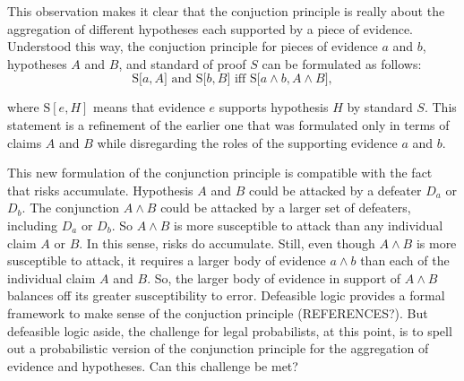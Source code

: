 \documentclass[10pt,dvipsnames,enabledeprecatedfontcommands]{scrartcl}
\begin{document}
This observation makes it clear that the conjuction principle is really
about the aggregation of different hypotheses each supported by a piece
of
evidence.
Understood this way, the conjuction principle for pieces of evidence
\(a\) and \(b\), hypotheses \(A\) and \(B\), and standard of proof \(S\)
can be formulated as follows:
\[\text{S[$a, A$] and S[$b, B$] iff S[$a \wedge b, A\wedge B$]},\]

\noindent where \(\text{S}[e, H]\) means that evidence \(e\) supports
hypothesis \(H\) by standard \(S\). This statement is a
refinement
of the earlier one that was formulated only in terms of claims \(A\) and
\(B\) while disregarding the roles of the supporting evidence \(a\) and
\(b\).

This new formulation of the conjunction principle is compatible with the
fact that risks
accumulate.
Hypothesis \(A\) and \(B\) could be attacked by a defeater \(D_a\) or
\(D_b\). The conjunction \(A \wedge B\) could be attacked by a larger
set of defeaters, including \(D_a\) or \(D_b\). So \(A \wedge B\) is
more susceptible to attack than any individual claim \(A\) or \(B\). In
this sense, risks do
accumulate.
Still, even though
\(A \wedge B\) is more susceptible to attack, it requires a larger body
of evidence \(a \wedge b\) than each of the individual claim \(A\) and
\(B\). So, the larger body of evidence in support of \(A \wedge B\)
balances off its greater susceptibility to error. Defeasible logic
provides a formal framework to make sense of the conjuction principle
(REFERENCES?). But defeasible logic aside, the challenge for legal
probabilists, at this point, is to spell out a probabilistic version of
the conjunction principle for the aggregation of evidence and
hypotheses. Can this challenge be met?
\end{document}
